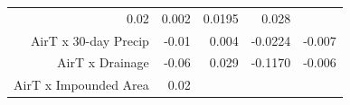\begin{longtable}[]{@{}rrrrr@{}}
\begin{minipage}[t]{0.08\columnwidth}
0.02\strut
\end{minipage} & \begin{minipage}[t]{0.07\columnwidth}\raggedleft\strut
0.002\strut
\end{minipage} & \begin{minipage}[t]{0.10\columnwidth}\raggedleft\strut
0.0195\strut
\end{minipage} & \begin{minipage}[t]{0.10\columnwidth}\raggedleft\strut
0.028\strut
\end{minipage}\tabularnewline
\begin{minipage}[t]{0.37\columnwidth}\raggedleft\strut
AirT x 30-day Precip\strut
\end{minipage} & \begin{minipage}[t]{0.08\columnwidth}\raggedleft\strut
-0.01\strut
\end{minipage} & \begin{minipage}[t]{0.07\columnwidth}\raggedleft\strut
0.004\strut
\end{minipage} & \begin{minipage}[t]{0.10\columnwidth}\raggedleft\strut
-0.0224\strut
\end{minipage} & \begin{minipage}[t]{0.10\columnwidth}\raggedleft\strut
-0.007\strut
\end{minipage}\tabularnewline
\begin{minipage}[t]{0.37\columnwidth}\raggedleft\strut
AirT x Drainage\strut
\end{minipage} & \begin{minipage}[t]{0.08\columnwidth}\raggedleft\strut
-0.06\strut
\end{minipage} & \begin{minipage}[t]{0.07\columnwidth}\raggedleft\strut
0.029\strut
\end{minipage} & \begin{minipage}[t]{0.10\columnwidth}\raggedleft\strut
-0.1170\strut
\end{minipage} & \begin{minipage}[t]{0.10\columnwidth}\raggedleft\strut
-0.006\strut
\end{minipage}\tabularnewline
\begin{minipage}[t]{0.37\columnwidth}\raggedleft\strut
AirT x Impounded Area\strut
\end{minipage} & \begin{minipage}[t]{0.08\columnwidth}\raggedleft\strut
0.02\strut
\end{minipage} & \begin{minipage}[t]{0.07\columnwidth}\raggedleft\strut

\end{minipage}
\end{longtable}
